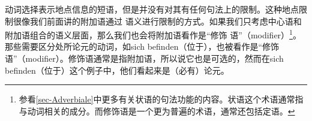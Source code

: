 %
%
动词选择表示地点信息的短语，但是并没有对其有任何句法上的限制。这种地点限制很像我们前面讲的附加语通过
语义进行限制的方式。如果我们只考虑中心语和附加语组合的语义层面，那么我们也会将附加语看作是“修饰
语”（modifier）\footnote{%
参看\ref{sec-Adverbiale}中更多有关状语的句法功能的内容。状语这个术语通常指与动词相关的成分。而修饰语是一个更为普遍的术语，通常还包括定语。}。
那些需要区分处所论元的动词，如sich befinden（位于），也被看作是“修饰语”（modifier）。修饰语通常是指附加语，所以说它也是可选的，然而在sich befinden（位于）这个例子中，他们看起来是（必有）论元。

